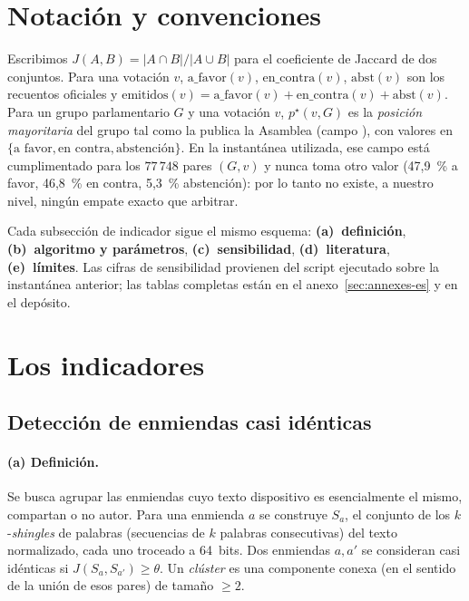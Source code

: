 \section{Notación y convenciones}\label{sec:notations-es}
Escribimos $J(A,B) = |A\cap B| / |A\cup B|$ para el coeficiente de Jaccard de dos
conjuntos. Para una votación $v$, $\mathrm{a\_favor}(v)$, $\mathrm{en\_contra}(v)$,
$\mathrm{abst}(v)$ son los recuentos oficiales y
$\text{emitidos}(v)=\mathrm{a\_favor}(v)+\mathrm{en\_contra}(v)+\mathrm{abst}(v)$.
Para un grupo parlamentario $G$ y una votación $v$, $p^\star(v,G)$ es la
\emph{posición mayoritaria} del grupo tal como la publica la Asamblea (campo
), con valores en $\{\text{a favor},\text{en contra},\text{abstención}\}$.
En la instantánea utilizada, ese campo está cumplimentado para los $77\,748$ pares
$(G,v)$ y nunca toma otro valor (47,9~\% \og{}a favor\fg{}, 46,8~\% \og{}en
contra\fg{}, 5,3~\% \og{}abstención\fg{}): por lo tanto no existe, a nuestro nivel,
ningún empate exacto que arbitrar.

Cada subsección de indicador sigue el mismo esquema: \textbf{(a)~definición},
\textbf{(b)~algoritmo y parámetros}, \textbf{(c)~sensibilidad}, \textbf{(d)~literatura},
\textbf{(e)~límites}. Las cifras de sensibilidad provienen del script
 ejecutado sobre la instantánea anterior; las tablas
completas están en el anexo~\ref{sec:annexes-es} y en el depósito.

\section{Los indicadores}

\subsection{Detección de enmiendas casi idénticas}\label{sec:clusters-es}

\paragraph{(a) Definición.} Se busca agrupar las enmiendas cuyo texto dispositivo
es \og{}esencialmente el mismo\fg{}, compartan o no autor. Para una enmienda $a$ se
construye $S_a$, el conjunto de los $k$-\emph{shingles} de palabras (secuencias de
$k$ palabras consecutivas) del texto normalizado, cada uno troceado a 64~bits. Dos
enmiendas $a,a'$ se consideran casi idénticas si $J(S_a,S_{a'})\ge\theta$. Un
\emph{clúster} es una componente conexa (en el sentido de la unión de esos pares)
de tamaño $\ge 2$.

